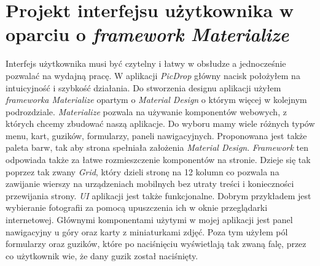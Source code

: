 \documentclass[openright]{xmgr}
\begin{document}
\section{Projekt interfejsu użytkownika w oparciu o \textit{framework Materialize}}
	Interfejs użytkownika musi być czytelny i łatwy w obsłudze a jednocześnie pozwalać na wydajną pracę. W aplikacji \textit{PicDrop} główny nacisk położyłem na intuicyjność i szybkość działania. Do stworzenia designu aplikacji użyłem \textit{frameworka Materialize} opartym o \textit{Material Design} o którym więcej w kolejnym podrozdziale. \textit{Materialize} pozwala na używanie komponentów webowych, z których chcemy zbudować naszą aplikacje. Do wyboru mamy wiele różnych typów menu, kart, guzików, formularzy, paneli nawigacyjnych. Proponowana jest także paleta barw, tak aby strona spełniała założenia \textit{Material Design}. \textit{Framework} ten odpowiada także za łatwe rozmieszczenie komponentów na stronie. Dzieje się tak poprzez tak zwany \textit{Grid}, który dzieli stronę na 12 kolumn co pozwala na zawijanie wierszy na urządzeniach mobilnych bez utraty treści i konieczności przewijania strony. \textit{UI} aplikacji jest także funkcjonalne. Dobrym przykładem jest wybieranie fotografii za pomocą upuszczenia ich w oknie przeglądarki internetowej. Głównymi komponentami użytymi w mojej aplikacji jest panel nawigacyjny u góry oraz karty z miniaturkami zdjęć. Poza tym użyłem pól formularzy oraz guzików, które po naciśnięciu wyświetlają tak zwaną falę, przez co użytkownik wie, że dany guzik został naciśnięty.
\end{document}
